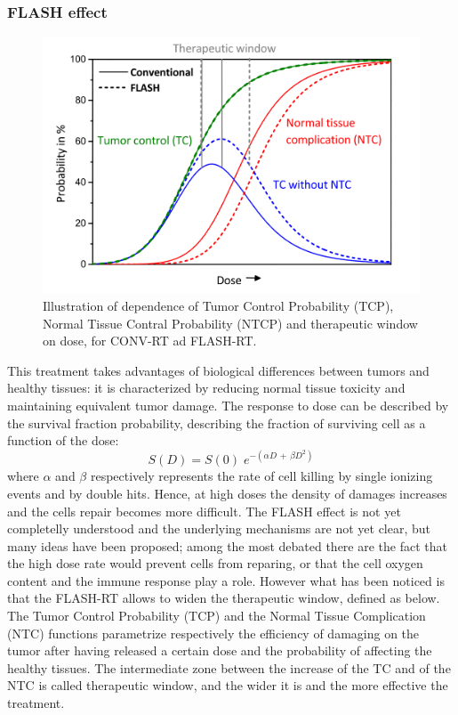         \subsubsection{FLASH effect}
            \begin{figure}
                \centering
                \includegraphics[width=.7\linewidth]{figures/pixel_detectors_usage/curve_flash.png}
                \caption{Illustration of dependence of Tumor Control Probability (TCP), Normal Tissue Contral Probability (NTCP) and therapeutic window on dose, for CONV-RT ad FLASH-RT.}
                \label{fig:therapeutic_window}
            \end{figure}
            This treatment takes advantages of biological differences between tumors and healthy tissues: it is characterized by reducing normal tissue toxicity and maintaining equivalent tumor damage. 
            The response to dose can be described by the survival fraction probability, describing the fraction of surviving cell as a function of the dose: 
            \begin{equation}
                S(D) = S(0)\;e^{-( \alpha D \, + \, \beta D^2)}
                \label{eq:survival_curve}
            \end{equation}
            where $\alpha$ and $\beta$ respectively represents the rate of cell killing by single ionizing events and by double hits. 
            Hence, at high doses the density of damages increases and the cells repair becomes more difficult. 
            The FLASH effect is not yet completelly understood and the underlying mechanisms are not yet clear, but many ideas have been proposed; among the most debated there are the fact that the high dose rate would prevent cells from reparing, or that the cell oxygen content and the immune response play a role.
            However what has been noticed is that the FLASH-RT allows to widen the therapeutic window, defined as below. 
            The Tumor Control Probability (TCP) and the Normal Tissue Complication (NTC) functions parametrize respectively the efficiency of damaging on the tumor after having released a certain dose and the probability of affecting the healthy tissues. The intermediate zone between the increase of the TC and of the NTC is called therapeutic window, and the wider it is and the more effective the treatment. 


